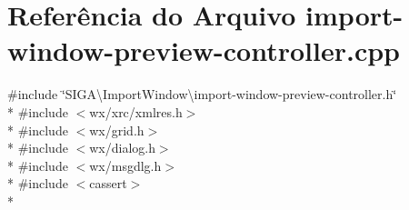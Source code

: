 \section{Referência do Arquivo import-\/window-\/preview-\/controller.cpp}
\label{import-window-preview-controller_8cpp}
{\ttfamily \#include \char`\"{}S\+I\+G\+A\textbackslash{}\+Import\+Window\textbackslash{}import-\/window-\/preview-\/controller.\+h\char`\"{}}\\*
{\ttfamily \#include $<$wx/xrc/xmlres.\+h$>$}\\*
{\ttfamily \#include $<$wx/grid.\+h$>$}\\*
{\ttfamily \#include $<$wx/dialog.\+h$>$}\\*
{\ttfamily \#include $<$wx/msgdlg.\+h$>$}\\*
{\ttfamily \#include $<$cassert$>$}\\*
